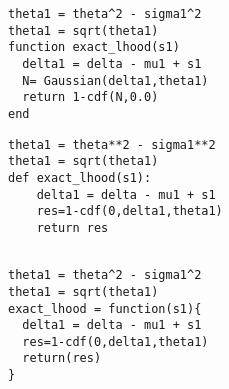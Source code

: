 \documentclass[article]{jss}
\newif\ifen
\newif\ifes
\newcommand{\en}[1]{\ifen#1\fi}
\newcommand{\es}[1]{\ifes#1\fi}
\begin{document}
%
\en{Assuming that the skill is known, we must replace the average estimate $\mu_1$ by the hypothesis $s_1$ in the expected difference $\delta$, and remove its own uncertainty from the total uncertainty $\vartheta^2$.}
\es{Al suponer conocida la habilidad, debemos remplazar su estimaci\'on media $\mu_1$ por la hip\'otesis $s_1$ en la diferencia esperada $\delta$, y remover su propia incertidumbre de la incertidumbre total $\vartheta^2$.}
%
\begin{lstlisting}[backgroundcolor=\color{white},label=lst:delta_1, caption=\relax, belowskip=-1.0 \baselineskip, aboveskip=-0 \baselineskip]
\end{lstlisting}
\begin{paracol}{3}
\begin{lstlisting}[backgroundcolor=\color{julia}]
theta1 = theta^2 - sigma1^2
theta1 = sqrt(theta1)
function exact_lhood(s1)
  delta1 = delta - mu1 + s1 
  N= Gaussian(delta1,theta1)
  return 1-cdf(N,0.0)
end
\end{lstlisting}  
 \switchcolumn
\begin{lstlisting}[backgroundcolor=\color{python}]
theta1 = theta**2 - sigma1**2
theta1 = sqrt(theta1)
def exact_lhood(s1):
    delta1 = delta - mu1 + s1 
    res=1-cdf(0,delta1,theta1)
    return res
    
\end{lstlisting} 
 \switchcolumn
\begin{lstlisting}[backgroundcolor=\color{r}]
theta1 = theta^2 - sigma1^2
theta1 = sqrt(theta1)
exact_lhood = function(s1){
  delta1 = delta - mu1 + s1 
  res=1-cdf(0,delta1,theta1)
  return(res)
}
\end{lstlisting}   
\end{paracol}

\subsection{\en{Elementary draw model}} \label{sec:empate}
\end{document}
